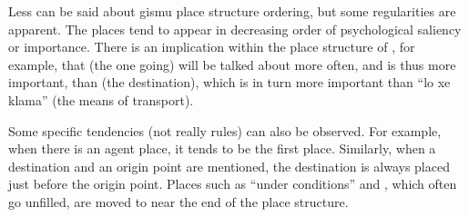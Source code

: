 Less can be said about gismu place structure ordering, but
    some regularities are apparent. The places tend to appear in
    decreasing order of psychological saliency or importance. There
    is an implication within the place structure of , for
    example, that  (the one going) will be talked about
    more often, and is thus more important, than 
    (the destination), which is in turn more important than ``lo xe
    klama'' (the means of transport).

Some specific tendencies (not really rules) can also be
    observed. For example, when there is an agent place, it tends
    to be the first place. Similarly, when a destination and an
    origin point are mentioned, the destination is always placed
    just before the origin point. Places such as ``under
    conditions'' and , which often go unfilled, are
    moved to near the end of the place structure.
